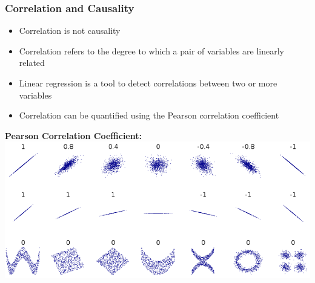 \subsubsection{Correlation and Causality}
\begin{itemize}
    \item Correlation is not causality
    \item Correlation refers to the degree to which a pair of variables are linearly related
    \item Linear regression is a tool to detect correlations between two or more variables
    \item Correlation can be quantified using the Pearson correlation coefficient
\end{itemize}
\textbf{Pearson Correlation Coefficient:}\\
\includegraphics[width=0.6\linewidth]{./img/pearson.png}